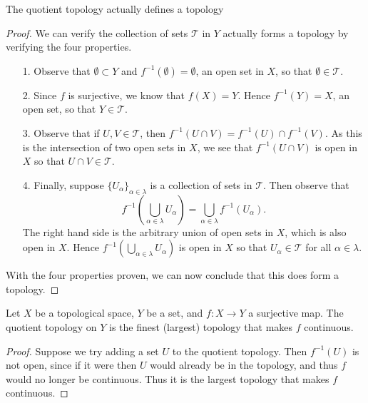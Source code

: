 \documentclass[letter,12pt,twoside]{hmcpset}
\begin{document}
\begin{problem}[Theorem 8.47]
    The quotient topology actually defines a topology
\end{problem}

\begin{proof}
    We can verify the collection of sets $\mathscr{T}$ in $Y$ actually
    forms a topology by verifying the four properties.
    \begin{itemize}
        \item[1.] Observe that $\emptyset \subset Y$ and 
        $f^{-1}(\emptyset) = \emptyset$, an open set in $X$, 
        so that $\emptyset \in\mathscr{T}$.

        \item[2.] Since $f$ is surjective, we know that $f(X) = Y$.
        Hence $f^{-1}(Y) = X$, an open set, so that $Y \in
        \mathscr{T}$.
        
        \item[3.] Observe that if $U, V \in \mathscr{T}$, then 
        $f^{-1}(U \cap V) = f^{-1}(U) \cap f^{-1}(V)$. As this is the
        intersection of two open sets in $X$, we see that $f^{-1}(U
        \cap V)$ is open in $X$ so that $U \cap V \in \mathscr{T}$.

        \item[4.] Finally, suppose $\{U_\alpha\}_{\alpha \in \lambda}$
        is a collection of sets in $\mathscr{T}$. Then observe that 
        \[
            f^{-1}(\bigcup\limits_{\alpha \in \lambda} U_{\alpha}) =
            \bigcup\limits_{\alpha \in \lambda} f^{-1}(U_{\alpha}).
        \]
        The right hand side is the arbitrary union of open sets in
        $X$, which is also open in $X$. Hence
        $f^{-1}(\bigcup\limits_{\alpha \in \lambda} U_{\alpha})$
        is open in $X$ so that $U_{\alpha} \in \mathscr{T}$ for all
        $\alpha \in \lambda$.
    \end{itemize}
    With the four properties proven, we can now conclude that this
    does form a topology.
\end{proof}

\begin{problem}[Theorem 8.48]
    Let $X$ be a topological space, $Y$ be a set, and $f: X
    \rightarrow Y$ a surjective map. The quotient topology on $Y$ is
    the finest (largest) topology that makes $f$ continuous.
\end{problem}

\begin{proof}
    Suppose we try adding a set $U$ to the quotient topology. Then
    $f^{-1}(U)$ is not open, since if it were then $U$ would already
    be in the topology, and thus $f$ would no longer be continuous.
    Thus it is the largest topology that makes $f$ continuous.
\end{proof}
\end{document}
